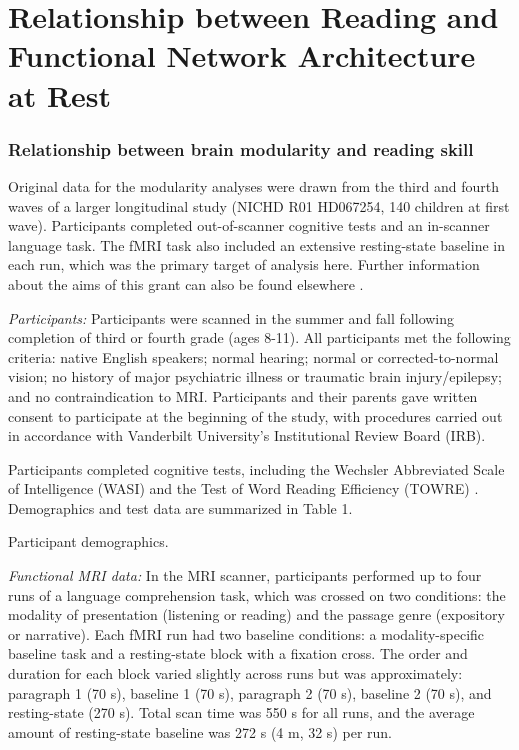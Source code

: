 \chapter{Relationship between Reading and Functional Network Architecture at Rest}




\subsection{Relationship between brain modularity and reading skill}
Original data for the modularity analyses were drawn from the third and fourth waves of a larger longitudinal study (NICHD R01 HD067254, 140 children at first wave). Participants completed out-of-scanner cognitive tests and an in-scanner language task. The fMRI task also included an extensive resting-state baseline in each run, which was the primary target of analysis here. Further information about the aims of this grant can also be found elsewhere \citep{Aboud2016, Wendelken2017}.

\emph{Participants:} Participants were scanned in the summer and fall following completion of third or fourth grade (ages 8-11). All participants met the following criteria: native English speakers; normal hearing; normal or corrected-to-normal vision; no history of major psychiatric illness or traumatic brain injury/epilepsy; and no contraindication to MRI. Participants and their parents gave written consent to participate at the beginning of the study, with procedures carried out in accordance with Vanderbilt University’s Institutional Review Board (IRB). 

Participants completed cognitive tests, including the Wechsler Abbreviated Scale of Intelligence (WASI) \citep{Kaplan1999} and the Test of Word Reading Efficiency (TOWRE) \citep{Torgesen2012}. Demographics and test data are summarized in Table 1. 

\begin{table}
\scriptsize
\renewcommand{\tabcolsep}{0.09cm}
\centering

\caption{Participant demographics.}
\label{table:Ch4_Participants}
\end{table}

\emph{Functional MRI data:} In the MRI scanner, participants performed up to four runs of a language comprehension task, which was crossed on two conditions: the modality of presentation (listening or reading) and the passage genre (expository or narrative).  Each fMRI run had two baseline conditions: a modality-specific baseline task and a resting-state block with a fixation cross. The order and duration for each block varied slightly across runs but was approximately: paragraph 1 (70 s), baseline 1 (70 s), paragraph 2 (70 s), baseline 2 (70 s), and resting-state (270 s). Total scan time was 550 s for all runs, and the average amount of resting-state baseline was 272 s (4 m, 32 s) per run.

